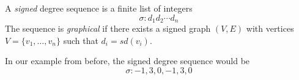 \begin{frame}
    \begin{definition}
        A \textit{signed} degree sequence is a finite list of integers
        \begin{equation*}
            \sigma : d_1d_2\cdots d_n
        \end{equation*}
        The sequence is \textit{graphical} if there exists a signed graph $(V,E)$ with vertices $V = \{v_1,\dots,v_n\}$ such that $d_i = sd(v_i)$.
    \end{definition}
    In our example from before, the signed degree sequence would be
    \begin{equation*}
        \sigma : -1, 3, 0, -1, 3, 0
    \end{equation*}
\end{frame}